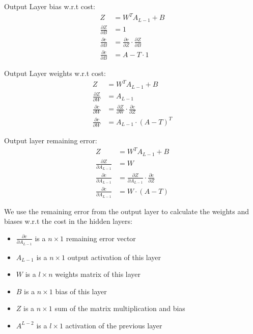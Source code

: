 Output Layer bias w.r.t cost:
\begin{equation}
    \begin{aligned}
        Z &= W^{T}A_{L-1} + B\\
        \frac{\partial Z}{\partial B} &= 1\\[2em]
        \frac{\partial c}{\partial B} &= \frac{\partial c}{\partial Z} \cdot \frac{\partial Z}{\partial B}\\
        \frac{\partial c}{\partial B} &= A - T \cdot 1
    \end{aligned}
\end{equation}

Output Layer weights w.r.t cost:
\begin{equation}
    \begin{aligned}
        Z &= W^{T}A_{L-1} + B\\
        \frac{\partial Z}{\partial W} &= A_{L-1}\\[2em]
        \frac{\partial c}{\partial W} &= \frac{\partial Z}{\partial W} \cdot \frac{\partial c}{\partial Z} \\
        \frac{\partial c}{\partial W} &= A_{L-1} \cdot (A - T)^{T}
    \end{aligned}
\end{equation}

Output layer remaining error:
\begin{equation}
    \begin{aligned}
        Z &= W^{T}A_{L-1} + B\\
        \frac{\partial Z}{\partial A_{L-1}} &= W\\[2em]
        \frac{\partial c}{\partial A_{L-1}} &= \frac{\partial Z}{\partial A_{L-1}} \cdot \frac{\partial c}{\partial Z}\\
        \frac{\partial c}{\partial A_{L-1}} &= W \cdot (A - T)
    \end{aligned}
\end{equation}

We use the remaining error from the output layer to calculate the weights and
biases w.r.t the cost in the hidden layers:
\begin{itemize}
    \item \( \frac{\partial c}{\partial A_{L-1}} \) is a \( n \times 1 \) remaining error vector 
    \item \( A_{L-1} \) is a  \( n \times 1 \) output activation of this layer
    \item \( W \) is a \( l \times n \) weights matrix of this layer
    \item \( B \) is a \( n \times 1 \) bias of this layer
    \item \( Z \) is a \( n \times 1 \) sum of the matrix multiplication and bias
    \item \(A^{L-2} \) is a \( l \times 1 \) activation of the previous layer
\end{itemize}

